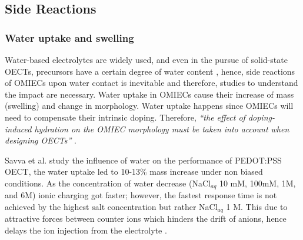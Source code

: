 \subsection{Side Reactions} \label{subsec:sidereac}



\subsubsection{Water uptake and swelling}

Water-based electrolytes are widely used, and even in the pursue of solid-state OECTs, precursors have a certain degree of water content \cite{weissbachPhotopatternableSolidElectrolyte2022}\cite{nguyen-dangBiomaterialBasedSolidElectrolyteOrganic2021}, hence, side reactions of OMIECs upon water contact is inevitable and therefore, studies to understand the impact are necessary.  %
Water uptake in OMIECs cause their increase of mass (swelling) and change in morphology. Water uptake happens since OMIECs will need to compensate their intrinsic doping. Therefore, \textit{``the effect of doping-induced hydration on the OMIEC morphology must be taken into account when designing OECTs''} \cite{savvaBalancingIonicElectronic2020}.

Savva et al. study the influence of water on the performance of PEDOT:PSS OECT, the water uptake %
led to 10-13\% mass increase under non biased conditions. As the concentration of water decrease (NaCl$_{aq}$ 10 mM, 100mM, 1M, and 6M) ionic charging got faster; %
however, the fastest %
response time is not achieved by the highest salt concentration but rather NaCl$_{aq}$ 1 M. This due to attractive forces between counter ions which %
hinders the drift of anions, hence delays the ion injection from the electrolyte %
\cite{savvaInfluenceWaterPerformance2019}.

